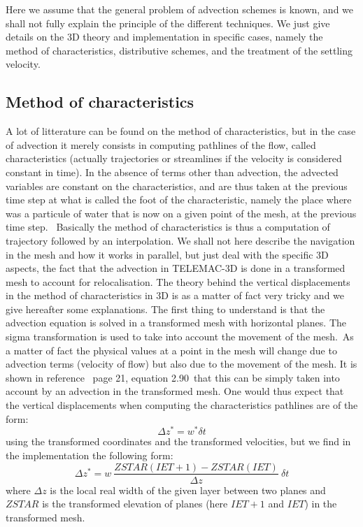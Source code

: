 Here we assume that the general problem of advection schemes is known, and we
shall not fully explain the principle of the different techniques. We just
give details on the 3D theory and implementation in specific cases, namely the
method of characteristics, distributive schemes, and the treatment of the
settling velocity.

\subsection{\label{methode des caracteristiques}Method of characteristics%
%
}

A lot of litterature can be found on the method of characteristics, but in the
case of advection it merely consists in computing pathlines of the flow,
called characteristics (actually trajectories or streamlines if the velocity
is considered constant in time). In the absence of terms other than advection,
the advected variables are constant on the characteristics, and are thus taken
at the previous time step at what is called the foot of the characteristic,
namely the place where was a particule of water that is now on a given point
of the mesh, at the previous time step. \ Basically the method of
characteristics is thus a computation of trajectory followed by an
interpolation. We shall not here describe the navigation in the mesh and how
it works in parallel, but just deal with the specific 3D aspects, the fact
that the advection in TELEMAC-3D is done in a transformed mesh to account for
relocalisation. The theory behind the vertical displacements in the method of
characteristics in 3D is as a matter of fact very tricky and we give hereafter
some explanations. The first thing to understand is that the advection
equation is solved in a transformed mesh with horizontal planes. The sigma
transformation is used to take into account the movement of the mesh.\ As a
matter of fact the physical values at a point in the mesh will change due to
advection terms (velocity of flow) but also due to the movement of the mesh.
It is shown in reference \cite{hervouet007}\ page 21, equation 2.90\ that this can
be simply taken into account by an advection in the transformed mesh. One
would thus expect that the vertical displacements when computing the
characteristics pathlines are of the form:%
\begin{equation}
\Delta z^{\ast}=w^{\ast}\delta t
\end{equation}
using the transformed coordinates and the transformed velocities, but we find
in the implementation the following form:
\begin{equation}
\Delta z^{\ast}=w~\dfrac{ZSTAR(IET+1)-ZSTAR(IET)}{\Delta z}~\delta t
\end{equation}
where $\Delta z$ is the local real width of the given layer between two planes
and $ZSTAR$ is the transformed elevation of planes (here $IET+1$ and $IET$) in
the transformed mesh.

